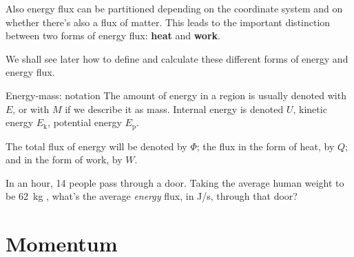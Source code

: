 \documentclass[a4paper,12pt,%
onecolumn,oneside,titlepage,%
british%
]{memoir}
\renewcommand*{\|}[1][]{\nonscript\:#1\vert\nonscript\:\mathopen{}}
\newcommand*{\sect}{\S}%
\newcommand*{\yM}{M}%
\newcommand*{\yE}{E}
\newcommand*{\yU}{U}
\newcommand*{\yEk}{\yE_{\textrm{k}}}%
\newcommand*{\yEp}{\yE_{\textrm{p}}}%
\newcommand*{\yH}{\varPhi}%
\newcommand*{\yQ}{Q}%
\newcommand*{\yW}{W}%
\begin{document}
Also energy flux can be partitioned depending on the coordinate system and on whether there's also a flux of matter. This leads to the important distinction between two forms of energy flux: \textbf{heat} and \textbf{work}.

We shall see later how to define and calculate these different forms of energy and energy flux.

\smallskip

\begin{definition}{Energy-mass: notation}
  The amount of energy in a region is usually denoted with $\yE$, or with $\yM$ if we describe it as mass. Internal energy is denoted $\yU$, kinetic energy $\yEk$, potential energy $\yEp$.

  \smallskip
  
  The total flux of energy will be denoted by $\yH$; the flux in the form of heat, by $\yQ$; and in the form of work, by $\yW$.
\end{definition}


\medskip

\begin{exercise}
  In an hour, 14 people pass through a door. Taking the average human weight to be \qty{62}{kg} \parencites{walpoleetal2012}, what's the average \emph{energy} flux, in \unit{J/s}, through that door?
\end{exercise}





\section{Momentum}
\label{sec:intro_momentum}
\end{document}
